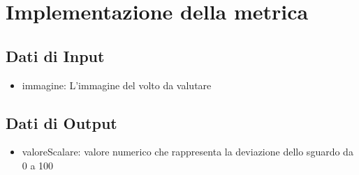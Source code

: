 \documentclass[12pt,a4paper,openright,twoside]{book}
\begin{document}
\section{Implementazione della metrica}

\subsection{Dati di Input}
\begin{itemize}
    \item immagine: L'immagine del volto da valutare
\end{itemize}
\subsection{Dati di Output}
\begin{itemize}
    \item valoreScalare: valore numerico che rappresenta la deviazione dello sguardo da 0 a 100
\end{itemize}
\end{document}
